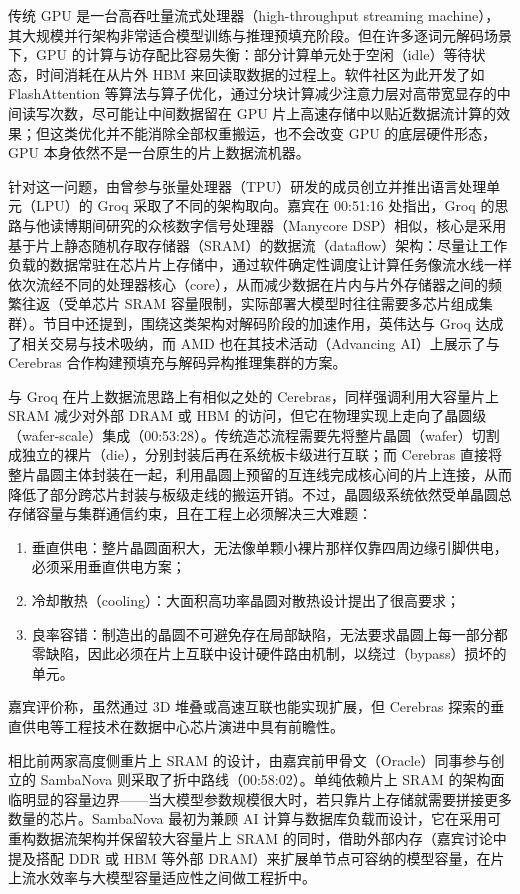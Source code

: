 \documentclass[UTF8,a4paper,11pt,fontset=fandol]{ctexart}
\begin{document}
传统 GPU 是一台高吞吐量流式处理器（high-throughput streaming machine），其大规模并行架构非常适合模型训练与推理预填充阶段。但在许多逐词元解码场景下，GPU 的计算与访存配比容易失衡：部分计算单元处于空闲（idle）等待状态，时间消耗在从片外 HBM 来回读取数据的过程上。软件社区为此开发了如 FlashAttention 等算法与算子优化，通过分块计算减少注意力层对高带宽显存的中间读写次数，尽可能让中间数据留在 GPU 片上高速存储中以贴近数据流计算的效果；但这类优化并不能消除全部权重搬运，也不会改变 GPU 的底层硬件形态，GPU 本身依然不是一台原生的片上数据流机器。

针对这一问题，由曾参与张量处理器（TPU）研发的成员创立并推出语言处理单元（LPU）的 Groq 采取了不同的架构取向。嘉宾在 00:51:16 处指出，Groq 的思路与他读博期间研究的众核数字信号处理器（Manycore DSP）相似，核心是采用基于片上静态随机存取存储器（SRAM）的数据流（dataflow）架构：尽量让工作负载的数据常驻在芯片片上存储中，通过软件确定性调度让计算任务像流水线一样依次流经不同的处理器核心（core），从而减少数据在片内与片外存储器之间的频繁往返（受单芯片 SRAM 容量限制，实际部署大模型时往往需要多芯片组成集群）。节目中还提到，围绕这类架构对解码阶段的加速作用，英伟达与 Groq 达成了相关交易与技术吸纳，而 AMD 也在其技术活动（Advancing AI）上展示了与 Cerebras 合作构建预填充与解码异构推理集群的方案。

与 Groq 在片上数据流思路上有相似之处的 Cerebras，同样强调利用大容量片上 SRAM 减少对外部 DRAM 或 HBM 的访问，但它在物理实现上走向了晶圆级（wafer-scale）集成（00:53:28）。传统造芯流程需要先将整片晶圆（wafer）切割成独立的裸片（die），分别封装后再在系统板卡级进行互联；而 Cerebras 直接将整片晶圆主体封装在一起，利用晶圆上预留的互连线完成核心间的片上连接，从而降低了部分跨芯片封装与板级走线的搬运开销。不过，晶圆级系统依然受单晶圆总存储容量与集群通信约束，且在工程上必须解决三大难题：
\begin{enumerate}
\item 垂直供电：整片晶圆面积大，无法像单颗小裸片那样仅靠四周边缘引脚供电，必须采用垂直供电方案；
\item 冷却散热（cooling）：大面积高功率晶圆对散热设计提出了很高要求；
\item 良率容错：制造出的晶圆不可避免存在局部缺陷，无法要求晶圆上每一部分都零缺陷，因此必须在片上互联中设计硬件路由机制，以绕过（bypass）损坏的单元。
\end{enumerate}
嘉宾评价称，虽然通过 3D 堆叠或高速互联也能实现扩展，但 Cerebras 探索的垂直供电等工程技术在数据中心芯片演进中具有前瞻性。

相比前两家高度侧重片上 SRAM 的设计，由嘉宾前甲骨文（Oracle）同事参与创立的 SambaNova 则采取了折中路线（00:58:02）。单纯依赖片上 SRAM 的架构面临明显的容量边界——当大模型参数规模很大时，若只靠片上存储就需要拼接更多数量的芯片。SambaNova 最初为兼顾 AI 计算与数据库负载而设计，它在采用可重构数据流架构并保留较大容量片上 SRAM 的同时，借助外部内存（嘉宾讨论中提及搭配 DDR 或 HBM 等外部 DRAM）来扩展单节点可容纳的模型容量，在片上流水效率与大模型容量适应性之间做工程折中。
\end{document}
